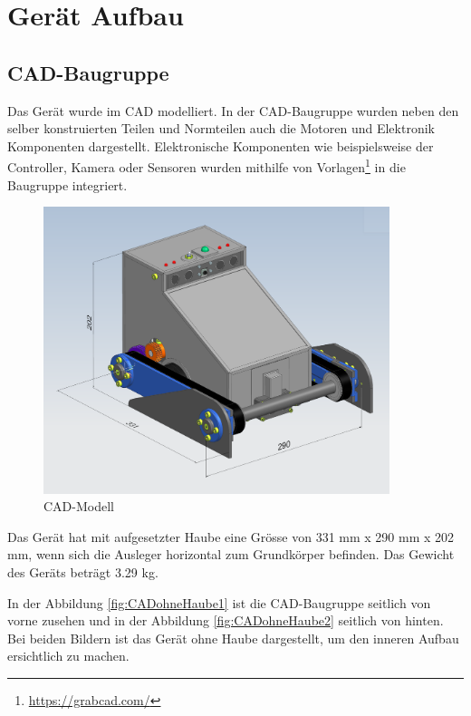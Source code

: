 \section{Gerät Aufbau}

\subsection{CAD-Baugruppe}

Das Gerät wurde im CAD modelliert. In der CAD-Baugruppe wurden neben den selber konstruierten Teilen und Normteilen auch die Motoren und Elektronik Komponenten dargestellt. Elektronische Komponenten wie beispielsweise der Controller, Kamera oder Sensoren wurden mithilfe von Vorlagen\footnote{\url{https://grabcad.com/}} in die Baugruppe  integriert.

\begin{figure}[H]
  \includegraphics[width=0.9\textwidth]{img/Gerät Aufbau/GerätmitHaubeundMasse.PNG}
  \centering
  \caption{CAD-Modell}
  \label{fig:CADmitMassen}
\end{figure}

Das Gerät hat mit aufgesetzter Haube eine Grösse von 331 mm x 290 mm x 202 mm, wenn sich die Ausleger horizontal zum Grundkörper befinden. Das Gewicht des Geräts beträgt 3.29 kg.

\newpage

In der Abbildung \ref{fig:CADohneHaube1} ist die CAD-Baugruppe seitlich von vorne zusehen und in der Abbildung \ref{fig:CADohneHaube2} seitlich von hinten. Bei beiden Bildern ist das Gerät ohne Haube dargestellt, um den inneren Aufbau ersichtlich zu machen.\\

